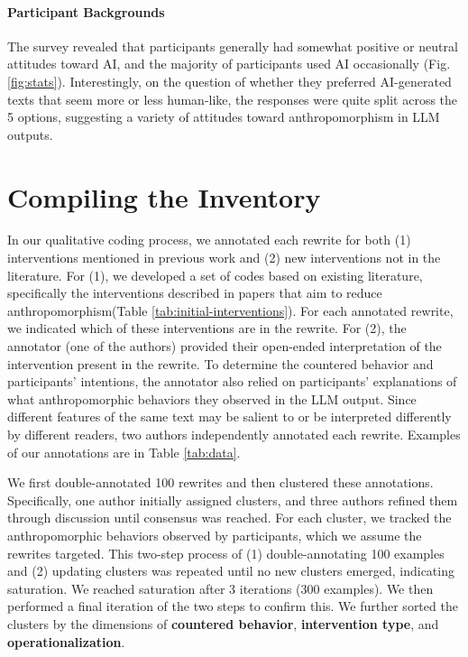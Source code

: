 \documentclass[11pt]{article}
\newcounter{intervention}  %
\newcommand{\ant}{anthropomorphism\xspace}
\begin{document}
\paragraph{Participant Backgrounds}\label{sec:participantbackground}
The survey revealed that participants generally had somewhat positive or neutral attitudes toward AI, and the majority of participants used AI occasionally (Fig. \ref{fig:stats}). Interestingly, on the question of whether they preferred AI-generated texts that seem more or less human-like, the responses were quite split across the 5 options, suggesting a variety of attitudes toward anthropomorphism in LLM outputs. 


\section{Compiling the Inventory}\label{sec:building}

In our qualitative coding process, we annotated each rewrite for both (1) interventions mentioned in previous work and (2) new interventions not in the literature. For (1), we developed a set of codes based on existing literature, specifically the interventions described in papers that aim to reduce \ant (Table \ref{tab:initial-interventions}). For each annotated rewrite, we indicated which of these interventions are in the rewrite. 
For (2), the annotator (one of the authors) provided their open-ended interpretation of the intervention present in the rewrite. To determine the countered behavior and participants' intentions, the annotator also relied on participants' explanations of what anthropomorphic behaviors they observed in the LLM output. Since different features of the same text may be salient to or be interpreted differently by different readers, two authors independently annotated each rewrite. Examples of our annotations are in Table \ref{tab:data}.

We first double-annotated 100 rewrites and then clustered these annotations. Specifically, one author initially assigned clusters, and three authors refined them through discussion until consensus was reached. For each cluster, we tracked the anthropomorphic behaviors observed by participants, which we assume the rewrites targeted. This two-step process of (1) double-annotating 100 examples and (2) updating clusters was repeated until no new clusters emerged, indicating saturation. We reached saturation after 3 iterations (300 examples). We then performed a final iteration of the two steps to confirm this. 
We further sorted the clusters by the dimensions of \textbf{countered behavior}, \textbf{intervention type}, and \textbf{operationalization}.
\end{document}
